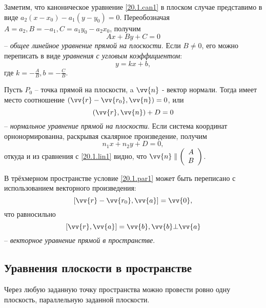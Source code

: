   Заметим, что каноническое уравнение \ref{20.1.can1} в плоском случае представимо в виде $a_2(x-x_0)-a_1(y-y_0)=0$. Переобозначая $A=a_2, B=-a_1, C=a_1y_0-a_2x_0$, получим
  \begin{equation}\label{20.1.lin1}
  Ax+By+C=0
  \end{equation}
  -- \textit{общее линейное уравнение прямой на плоскости}. Если $B\neq0$, его можно переписать в виде \textit{уравнения с угловым коэффициентом}:
  \begin{equation}\label{20.1.ang1}
  y=kx+b,
  \end{equation}
  где $k=-\frac AB, b=-\frac CB$.
    
  Пусть $P_0$ -- точка прямой на плоскости, a $\vv{n}$ - вектор нормали. Тогда имеет место соотношение $(\vv{r}-\vv{r_0},\vv{n})=0$, или
  \begin{equation}\label{20.1.norm1}
  (\vv{r},\vv{n})+D=0
  \end{equation}
  -- \textit{нормальное уравнение прямой на плоскости}. Если система координат орнонормированна, раскрывая скалярное произведение, получим
  \begin{equation}
  n_1x+n_2y+D=0,
  \end{equation}
откуда и из сравнения с \ref{20.1.lin1} видно, что $\vv{n}\parallel\left(\begin{array}{crl}
A\\
B
\end{array}\right)$.   

  В трёхмерном пространстве условие \ref{20.1.par1} может быть переписано с использованием векторного произведения:
  \begin{equation}\label{20.1.vect1}
  [\vv{r}-\vv{r_0},\vv{a}]=\vv{0}, 
  \end{equation}
  что равносильно
  \begin{equation}\label{20.1.vect1}
  [\vv{r},\vv{a}]=\vv{b}, \vv{b}\bot\vv{a}
  \end{equation}
  -- \textit{векторное уравнение прямой в пространстве}.
  
\subsection{Уравнения плоскости в пространстве}
\begin{axiome}
Через любую заданную точку пространства можно провести ровно одну плоскость, параллельную заданной плоскости.
\end{axiome}

